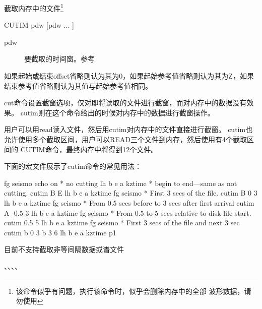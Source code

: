 \label{cmd:cutim}

截取内存中的文件\footnote{该命令似乎有问题，执行该命令时，似乎会删除内存中的全部
波形数据，请勿使用}

\begin{SACSTX}
CUTIM pdw [pdw ... ]
\end{SACSTX}

\begin{description}
\item [pdw] 要截取的时间窗。参考
\end{description}

如果起始或结束offset省略则认为其为0，如果起始参考值省略则认为其为Z，如果结束参考值省略则认为其值与起始参考值相同。

cut命令设置截窗选项，仅对即将读取的文件进行截窗，而对内存中的数据没有效果。
cutim则在这个命令给出的时候对内存中的数据进行截窗操作。

用户可以用read读入文件，然后用cutim对内存中的文件直接进行截窗。
cutim也允许使用多个截取区间，用户可以READ三个文件到内存，然后使用有4个截取区间的
CUTIM命令，最终内存中将得到12个文件。

下面的宏文件展示了cutim命令的常见用法：
\begin{SACCode}
fg seismo
echo on
* no cutting
lh b e a kztime
* begin to end---same as not cutting.
cutim B E
lh b e a kztime
fg seismo
* First 3 secs of the file.
cutim B 0 3
lh b e a kztime
fg seismo
* From 0.5 secs before to 3 secs after first arrival
cutim A -0.5 3
lh b e a kztime
fg seismo
* From 0.5 to 5 secs relative to disk file start.
cutim 0.5 5
lh b e a kztime
fg seismo
* First 3 secs of the file and next 3 sec
cutim b 0 3 b 3 6
lh b e a kztime
p1
\end{SACCode}

目前不支持截取非等间隔数据或谱文件

、、、、
